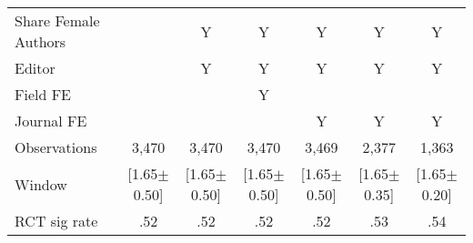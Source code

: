 \begin{tabular}{l*{6}{c}}
Share Female Authors &         &        Y&        Y&        Y&        Y&        Y\\
Editor          &         &        Y&        Y&        Y&        Y&        Y\\
Field FE        &         &         &        Y&         &         &         \\
Journal FE      &         &         &         &        Y&        Y&        Y\\
\hline
Observations    &    3,470&    3,470&    3,470&    3,469&    2,377&    1,363\\
Window          &[1.65$\pm$0.50]&[1.65$\pm$0.50]&[1.65$\pm$0.50]&[1.65$\pm$0.50]&[1.65$\pm$0.35]&[1.65$\pm$0.20]\\
RCT sig rate    &      .52&      .52&      .52&      .52&      .53&      .54\\
\hline\hline
\end{tabular}
